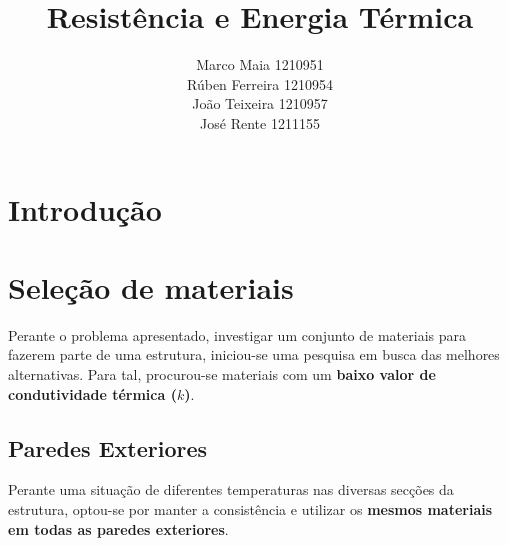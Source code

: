 \documentclass[12pt, a4paper]{article}
\title{
    Resist\^{e}ncia e Energia {\textemdash} T\'ermica
}
\author{
    Marco Maia          {\textemdash}    1210951\\
    R\'{u}ben Ferreira  {\textemdash}    1210954\\
    Jo\~{a}o Teixeira   {\textemdash}    1210957\\
    Jos\'{e} Rente      {\textemdash}    1211155\\
}
\begin{document}
\makeatletter
{}
\makeatother
\thispagestyle{empty}
\newpage

\tableofcontents
\printindex
\newpage

\section{Introdução}\label{sec:intro}


\section{Seleção de materiais}\label{sec:select}

Perante o problema apresentado, investigar um conjunto de materiais para fazerem parte de uma
estrutura, iniciou-se uma pesquisa em busca das melhores alternativas. Para tal, procurou-se
materiais com um \textbf{baixo valor de condutividade térmica ($k$)}.

\subsection{Paredes Exteriores}\label{sec:pext}

Perante uma situação de diferentes temperaturas nas diversas secções da estrutura, optou-se por manter a consistência
e utilizar os \textbf{mesmos materiais em todas as paredes exteriores}.
\end{document}

